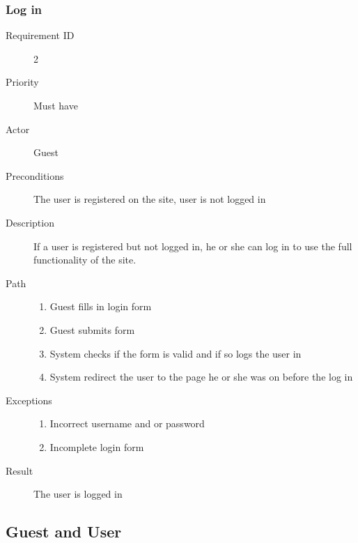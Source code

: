 		\subsubsection{Log in}
			\begin{description}
				\item[Requirement ID] 2
				\item[Priority] Must have
				\item[Actor] Guest
				\item[Preconditions] The user is registered on the site,
				user is not logged in
				\item[Description]
				If a user is registered but not logged in, he or she can
				log in to use the full functionality of the site.
				\item[Path]
 					\begin{enumerate}
						\item Guest fills in login form
						\item Guest submits form
						\item System checks if the form is valid and if so logs
						the user in
						\item System redirect the user to the page he or she was on
							before the log in
					\end{enumerate}
				\item[Exceptions]
					\begin{enumerate}
						\item Incorrect username and or password
						\item Incomplete login form
					\end{enumerate}
				\item[Result] The user is logged in
			\end{description}
	\subsection{Guest and User}
